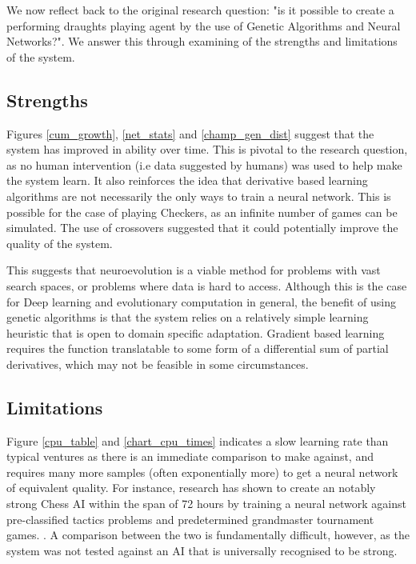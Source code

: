 \documentclass[12pt,a4paper]{article}
\begin{document}

    We now reflect back to the original research question: "is it possible to create a performing draughts playing agent by the use of Genetic Algorithms and Neural Networks?".  We answer this through examining of the strengths and limitations of the system. 

    \subsection{Strengths}

    Figures \ref{cum_growth}, \ref{net_stats} and \ref{champ_gen_dist} suggest that the system has improved in ability over time. This is pivotal to the research question, as no human intervention (i.e data suggested by humans) was used to help make the system learn. It also reinforces the idea that derivative based learning algorithms are not necessarily the only ways to train a neural network. This is possible for the case of playing Checkers, as an infinite number of games can be simulated. The use of crossovers suggested that it could potentially improve the quality of the system.
    
    This suggests that neuroevolution is a viable method for problems with vast search spaces, or problems where data is hard to access. Although this is the case for Deep learning and evolutionary computation in general, the benefit of using genetic algorithms is that the system relies on a relatively simple learning heuristic that is open to domain specific adaptation. Gradient based learning requires the function  translatable to some form of a differential sum of partial derivatives, which may not be feasible in some circumstances.

    \subsection{Limitations}
    Figure \ref{cpu_table} and \ref{chart_cpu_times} indicates a slow learning rate than typical ventures as there is an immediate comparison to make against, and requires many more samples (often exponentially more) to get a neural network of equivalent quality. For instance, research has shown to create an notably strong Chess AI within the span of 72 hours by training a neural network against pre-classified tactics problems and predetermined grandmaster tournament games. \cite{lai_giraffe:_2015}. A comparison between the two is fundamentally difficult, however, as the system was not tested against an AI that is universally recognised to be strong.
\end{document}
